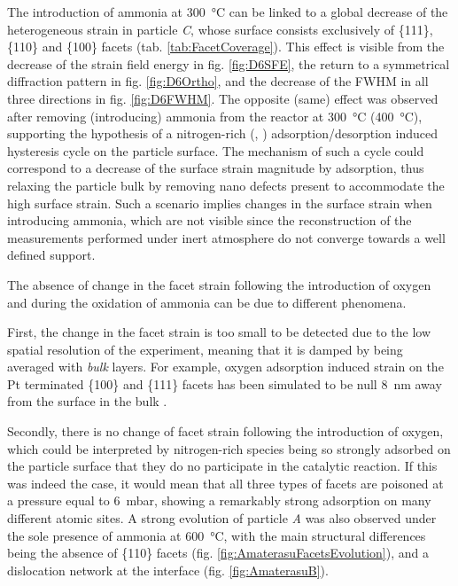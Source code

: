 The introduction of ammonia at \qty{300}{\degreeCelsius} can be linked to a global decrease of the heterogeneous strain in particle \textit{C}, whose surface consists exclusively of \{111\}, \{110\} and \{100\} facets (tab. \ref{tab:FacetCoverage}).
This effect is visible from the decrease of the strain field energy in fig. \ref{fig:D6SFE}, the return to a symmetrical diffraction pattern in fig. \ref{fig:D6Ortho}, and the decrease of the FWHM in all three directions in fig. \ref{fig:D6FWHM}.
The opposite (same) effect was observed after removing (introducing) ammonia from the reactor at \qty{300}{\degreeCelsius} (\qty{400}{\degreeCelsius}), supporting the hypothesis of a nitrogen-rich (, ) adsorption/desorption induced hysteresis cycle on the particle surface.
The mechanism of such a cycle could correspond to a decrease of the surface strain magnitude by adsorption, thus relaxing the particle bulk by removing nano defects present to accommodate the high surface strain.
Such a scenario implies changes in the surface strain when introducing ammonia, which are not visible since the reconstruction of the measurements performed under inert atmosphere do not converge towards a well defined support.

The absence of change in the facet strain following the introduction of oxygen and during the oxidation of ammonia can be due to different phenomena.

First, the change in the facet strain is too small to be detected due to the low spatial resolution of the experiment, meaning that it is damped by being averaged with \textit{bulk} layers.
For example, oxygen adsorption induced strain on the Pt terminated \{100\} and \{111\} facets has been simulated to be null \qty{8}{\nm} away from the surface in the bulk \parencite{Kim2021}.

Secondly, there is no change of facet strain following the introduction of oxygen, which could be interpreted by nitrogen-rich species being so strongly adsorbed on the particle surface that they do no participate in the catalytic reaction.
If this was indeed the case, it would mean that all three types of facets are poisoned at a  pressure equal to \qty{6}{\milli\bar}, showing a remarkably strong adsorption on many different atomic sites.
A strong evolution of particle \textit{A} was also observed under the sole presence of ammonia at \qty{600}{\degreeCelsius}, with the main structural differences being the absence of \{110\} facets (fig. \ref{fig:AmaterasuFacetsEvolution}), and a dislocation network at the interface (fig. \ref{fig:AmaterasuB}).

